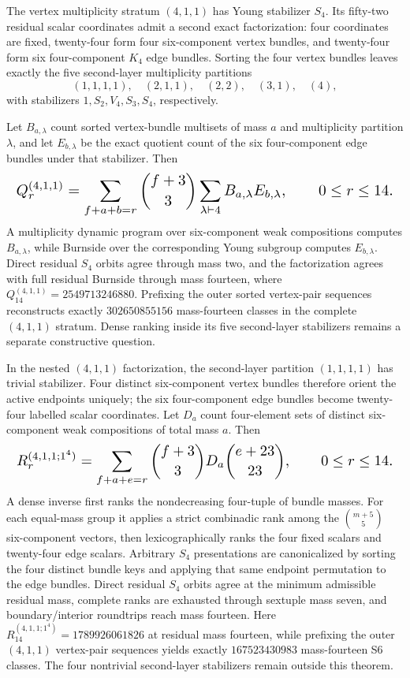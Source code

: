 \documentclass{article}
\newcommand{\fitmath}[1]{\resizebox{0.99\linewidth}{!}{$\displaystyle #1$}}
\begin{document}
The vertex multiplicity stratum $(4,1,1)$ has Young stabilizer $S_4$.
Its fifty-two residual scalar coordinates admit a second exact factorization:
four coordinates are fixed, twenty-four form four six-component vertex
bundles, and twenty-four form six four-component $K_4$ edge bundles. Sorting
the four vertex bundles leaves exactly the five second-layer multiplicity
partitions
\[
  (1,1,1,1),\quad(2,1,1),\quad(2,2),\quad(3,1),\quad(4),
\]
with stabilizers $1,S_2,V_4,S_3,S_4$, respectively.

Let $B_{a,\lambda}$ count sorted vertex-bundle multisets of mass $a$ and
multiplicity partition $\lambda$, and let $E_{b,\lambda}$ be the exact quotient
count of the six four-component edge bundles under that stabilizer. Then
\begin{equation}
  \fitmath{%
    Q_r^{(4,1,1)}=
      \sum_{f+a+b=r}{f+3\choose3}
      \sum_{\lambda\vdash4}B_{a,\lambda}E_{b,\lambda},
    \qquad 0\leq r\leq14.
  }
  \label{eq:optimization-crazy-sextuple-s6-s4-vertex-decomposition}
\end{equation}
A multiplicity dynamic program over six-component weak compositions computes
$B_{a,\lambda}$, while Burnside over the corresponding Young subgroup computes
$E_{b,\lambda}$. Direct residual $S_4$ orbits agree through mass two, and the
factorization agrees with full residual Burnside through mass fourteen, where
$Q_{14}^{(4,1,1)}=2549713246880$. Prefixing the outer sorted vertex-pair
sequences reconstructs exactly $302650855156$ mass-fourteen classes in the
complete $(4,1,1)$ stratum. Dense ranking inside its five second-layer
stabilizers remains a separate constructive question.

In the nested $(4,1,1)$ factorization, the second-layer partition
$(1,1,1,1)$ has trivial stabilizer. Four distinct six-component vertex bundles
therefore orient the active endpoints uniquely; the six four-component edge
bundles become twenty-four labelled scalar coordinates. Let $D_a$ count
four-element sets of distinct six-component weak compositions of total mass
$a$. Then
\begin{equation}
  \fitmath{%
    R_r^{(4,1,1;1^4)}=
      \sum_{f+a+e=r}{f+3\choose3}D_a{e+23\choose23},
    \qquad 0\leq r\leq14.
  }
  \label{eq:optimization-crazy-sextuple-s6-s4-distinct-bundle-ranking}
\end{equation}
A dense inverse first ranks the nondecreasing four-tuple of bundle masses. For
each equal-mass group it applies a strict combinadic rank among the
${m+5\choose5}$ six-component vectors, then lexicographically ranks the four
fixed scalars and twenty-four edge scalars. Arbitrary $S_4$ presentations are
canonicalized by sorting the four distinct bundle keys and applying that same
endpoint permutation to the edge bundles. Direct residual $S_4$ orbits agree at
the minimum admissible residual mass, complete ranks are exhausted through
sextuple mass seven, and boundary/interior roundtrips reach mass fourteen.
Here $R_{14}^{(4,1,1;1^4)}=1789926061826$ at residual mass fourteen, while
prefixing the outer $(4,1,1)$ vertex-pair sequences yields exactly
$167523430983$ mass-fourteen S6 classes. The four nontrivial second-layer
stabilizers remain outside this theorem.
\end{document}
